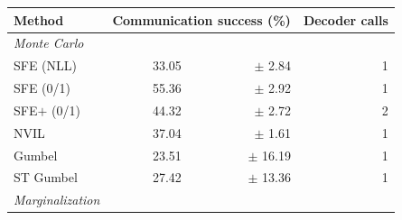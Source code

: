 \begin{table}[t]
    \begin{center}
        \tlfstyle
        \begin{tabular}{lrrr}
            \toprule
            Method                                 & \multicolumn{2}{r}{Communication success (\%)}                                                        & Decoder calls                                                          \\
            \midrule
            {\emph{Monte Carlo}}                   &                                                                                                       &                                     &                                  \\
            SFE (NLL)                              & 33.05\!\!\!\!\!\!\!\!\!\!\!\!\!\!\!\!\!\!\!\!\!\!\!\!\!\!\!\!\!\!\!\!\!\!\!\!\!\!\!\!\!\!\!\!\!\!\!\! & {\color{gray}$\pm$ \phantom{1}2.84} & 1                                \\
            SFE (0/1)                              & 55.36\!\!\!\!\!\!\!\!\!\!\!\!\!\!\!\!\!\!\!\!\!\!\!\!\!\!\!\!\!\!\!\!\!\!\!\!\!\!\!\!\!\!\!\!\!\!\!\! & {\color{gray}$\pm$ \phantom{1}2.92} & 1                                \\
            SFE$+$ (0/1)                           & 44.32\!\!\!\!\!\!\!\!\!\!\!\!\!\!\!\!\!\!\!\!\!\!\!\!\!\!\!\!\!\!\!\!\!\!\!\!\!\!\!\!\!\!\!\!\!\!\!\! & {\color{gray}$\pm$ \phantom{1}2.72} & 2                                \\
            NVIL                                   & 37.04\!\!\!\!\!\!\!\!\!\!\!\!\!\!\!\!\!\!\!\!\!\!\!\!\!\!\!\!\!\!\!\!\!\!\!\!\!\!\!\!\!\!\!\!\!\!\!\! & {\color{gray}$\pm$ \phantom{1}1.61} & 1                                \\
            Gumbel                                 & 23.51\!\!\!\!\!\!\!\!\!\!\!\!\!\!\!\!\!\!\!\!\!\!\!\!\!\!\!\!\!\!\!\!\!\!\!\!\!\!\!\!\!\!\!\!\!\!\!\! & {\color{gray}$\pm$ 16.19}           & 1                                \\
            ST Gumbel                              & 27.42\!\!\!\!\!\!\!\!\!\!\!\!\!\!\!\!\!\!\!\!\!\!\!\!\!\!\!\!\!\!\!\!\!\!\!\!\!\!\!\!\!\!\!\!\!\!\!\! & {\color{gray}$\pm$ 13.36}           & 1                                \\
            \spacerule
            \emph{Marginalization}                 &                                                                                                       &                                     &                                  \\

\end{tabular}
\end{center}
\end{table}

